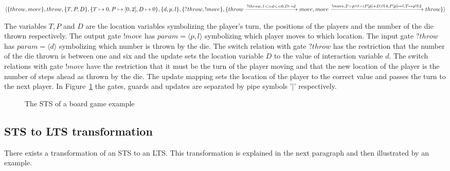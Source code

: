 $\langle\{throw, move\},throw,\{T, P, D\},\{T \mapsto 0, P \mapsto [0, 2], D \mapsto 0\},\{d, p, l\},\{?throw, !move\},\\
\{throw\xrightarrow{?throw, 1 <= d <= 6, D \mapsto d}move, move\xrightarrow{!move, T=p \land l=(P[p]+D)\%4, P[p] \mapsto l, T \mapsto p\%2}throw\}\rangle$

The variables $T, P$ and $D$ are the location variables symbolizing the player's turn, the positions of the players and the number of the die thrown respectively. The output gate $!move$ has $param = \langle p, l\rangle$ symbolizing which player moves to which location. The input gate $?throw$ has $param = \langle d\rangle$ symbolizing which number is thrown by the die. The switch relation with gate $?throw$ has the restriction that the number of the die thrown is between one and six and the update sets the location variable $D$ to the value of interaction variable $d$. The switch relations with gate $!move$ have the restriction that it must be the turn of the player moving and that the new location of the player is the number of steps ahead as thrown by the die. The update mapping sets the location of the player to the correct value and passes the turn to the next player. In Figure~\ref{fig:example_sts} the gates, guards and updates are separated by pipe symbols '|' respectively.

\begin{figure}[h]
  \begin{center}
    
  \end{center}
  \caption{The STS of a board game example}
  \label{fig:example_sts}
\end{figure}

\subsection{STS to LTS transformation}\label{sec:sts_lts_trafo}
There exists a transformation of an STS to an LTS. This transformation is explained in the next paragraph and then illustrated by an example.

